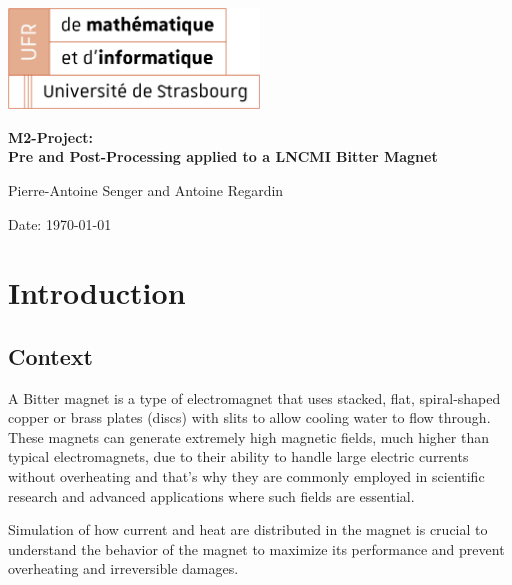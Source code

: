 \documentclass[12pt]{article}
\begin{document}
\begin{titlepage}
\centering
\includegraphics[width=0.5\textwidth]{images/logo-ufr.png}\par\vspace{1cm}
\vspace{1.5cm}
{\huge\bfseries M2-Project: \\
Pre and Post-Processing applied to a LNCMI Bitter Magnet\par}
\vspace{2cm}
{\Large Pierre-Antoine Senger and Antoine Regardin\par}
\vfill


\vfill

{\large Date: \today\par}
\end{titlepage}

\tableofcontents

\newpage

\section{Introduction}

\subsection{Context}
A Bitter magnet is a type of electromagnet that uses stacked, flat, spiral-shaped 
copper or brass plates (discs) with slits to allow cooling water to flow through. 
These magnets can generate extremely high magnetic fields, much higher than typical 
electromagnets, due to their ability to handle large electric currents without 
overheating and that's why they are commonly employed in scientific research and 
advanced applications where such fields are essential.

Simulation of how current and heat are distributed in the magnet is crucial to
understand the behavior of the magnet to maximize its performance and prevent
overheating and irreversible damages.
\end{document}
